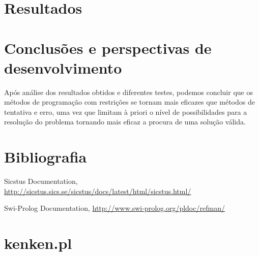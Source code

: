 \documentclass[runningheads,a4paper]{llncs}
\begin{document}
\section{Resultados}

\section{Conclusões e perspectivas de desenvolvimento}
Após análise dos resultados obtidos e diferentes testes, podemos concluir que os métodos de programação com restrições se tornam mais eficazes que métodos de tentativa e erro, uma vez que limitam à priori o nível de possibilidades para a resolução do problema tornando mais eficaz a procura de uma solução válida.

\section{Bibliografia}

\begin{thebibliography}{4}

 Sicstus Documentation, \url{http://sicstus.sics.se/sicstus/docs/latest/html/sicstus.html/}

 Swi-Prolog Documentation, \url{http://www.swi-prolog.org/pldoc/refman/}

\end{thebibliography}

\newpage
\appendix
\section{kenken.pl}
\lstset{
language=Prolog,
numbers=left,
frame=single,
breaklines=true,
}

%
\end{document}
